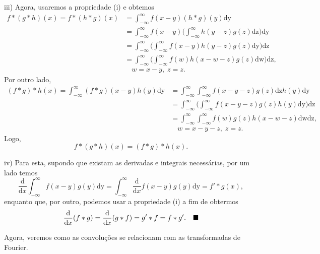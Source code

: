 \documentclass[../pde_notes.tex]{subfiles}
\begin{document}
\begin{proof*}
	iii) Agora, usaremos a propriedade (i) e obtemos
	\begin{align*}
		f*(g*h)(x) = f*(h*g)(x) & = \int_{-\infty}^{\infty}f(x-y)(h*g)(y) \mathrm{dy}                                                     \\
		                        & = \int_{-\infty}^{\infty}f(x-y)\biggl(\int_{-\infty}^{\infty}h(y-z)g(z) \mathrm{dz}\biggr) \mathrm{dy}  \\
		                        & = \int_{-\infty}^{\infty}\biggl(\int_{-\infty}^{\infty}f(x-y)h(y-z)g(z) \mathrm{dy}\biggr) \mathrm{dz}  \\
		                        & = \int_{-\infty}^{\infty}\biggl(\int_{-\infty}^{\infty}f(w)h(x-w-z)g(z) \mathrm{dw}\biggr) \mathrm{dz}, \\
		                        & \quad w = x-y,\; z=z.
	\end{align*}
	Por outro lado,
	\begin{align*}
		(f*g)*h(x) = \int_{-\infty}^{\infty}(f*g)(x-y)h(y) \mathrm{dy} & = \int_{-\infty}^{\infty}\int_{-\infty}^{\infty}f(x-y-z)g(z) \mathrm{dz}h(y) \mathrm{dy}               \\
		                                                               & = \int_{-\infty}^{\infty}\biggl(\int_{-\infty}^{\infty}f(x-y-z)g(z)h(y) \mathrm{dy}\biggr) \mathrm{dz} \\
		                                                               & = \int_{-\infty}^{\infty}\int_{-\infty}^{\infty} f(w)g(z)h(x-w-z) \mathrm{dw}\mathrm{dz},              \\
		                                                               & \quad w=x-y-z,\; z=z.
	\end{align*}
	Logo,
	\[
		f*(g*h)(x) = (f*g)*h(x).
	\]

	iv) Para esta, supondo que existam as derivadas e integrais necessárias, por um lado temos
	\[
		\frac{\mathrm{d}}{\mathrm{d}x}\int_{-\infty}^{\infty}f(x-y)g(y) \mathrm{dy} = \int_{-\infty}^{\infty}\frac{\mathrm{d}}{\mathrm{d}x}f(x-y)g(y) \mathrm{dy} = f'*g(x),
	\]
	enquanto que, por outro, podemos usar a propriedade (i) a fim de obtermos
	\[
		\frac{\mathrm{d}}{\mathrm{d}x}(f*g) = \frac{\mathrm{d}}{\mathrm{d}x}(g*f) = g'*f = f*g'. \quad \text{$\blacksquare$}
	\]
\end{proof*}
Agora, veremos como as convoluções se relacionam com as transformadas de Fourier.
\end{document}
